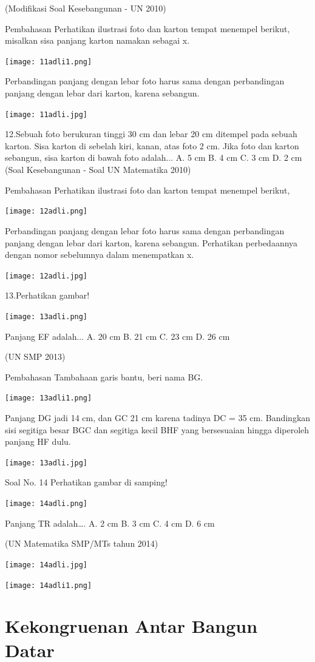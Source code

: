 \documentclass[11pt,fleqn]{book} %
\begin{document}
(Modifikasi Soal Kesebangunan - UN 2010)

Pembahasan
Perhatikan ilustrasi foto dan karton tempat menempel berikut, misalkan sisa panjang karton namakan sebagai x.

\texttt{[image: 11adli1.png]}

Perbandingan panjang dengan lebar foto harus sama dengan perbandingan panjang dengan lebar dari karton, karena sebangun. 

\texttt{[image: 11adli.jpg]}

12.Sebuah foto berukuran tinggi 30 cm dan lebar 20 cm ditempel pada sebuah karton. Sisa karton di sebelah kiri, kanan, atas foto 2 cm. Jika foto dan karton sebangun, sisa karton di bawah foto adalah...
A. 5 cm 
B. 4 cm 
C. 3 cm 
D. 2 cm 
(Soal Kesebangunan - Soal UN Matematika 2010) 

Pembahasan
Perhatikan ilustrasi foto dan karton tempat menempel berikut, 

\texttt{[image: 12adli.png]}

Perbandingan panjang dengan lebar foto harus sama dengan perbandingan panjang dengan lebar dari karton, karena sebangun.
Perhatikan perbedaannya dengan nomor sebelumnya dalam menempatkan x.

\texttt{[image: 12adli.jpg]}

13.Perhatikan gambar! 

\texttt{[image: 13adli.png]}

Panjang EF adalah...
A. 20 cm
B. 21 cm
C. 23 cm
D. 26 cm

(UN SMP 2013)

Pembahasan
Tambahaan garis bantu, beri nama BG. 

\texttt{[image: 13adli1.png]}

Panjang DG jadi 14 cm, dan GC 21 cm karena tadinya DC = 35 cm. Bandingkan sisi segitiga besar BGC dan segitiga kecil BHF yang bersesuaian hingga diperoleh panjang HF dulu. 

\texttt{[image: 13adli.jpg]}

Soal No. 14
Perhatikan gambar di samping! 

\texttt{[image: 14adli.png]}

Panjang TR adalah….
A. 2 cm
B. 3 cm
C. 4 cm
D. 6 cm

(UN Matematika SMP/MTs tahun 2014)

\texttt{[image: 14adli.jpg]}

\texttt{[image: 14adli1.png]}


\section{Kekongruenan Antar Bangun Datar}
\end{document}
